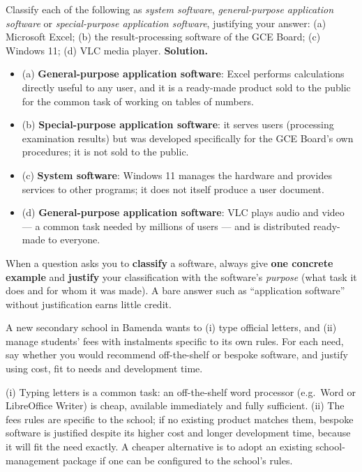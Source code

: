 \documentclass[11pt]{article}
\begin{document}
\begin{exoresolu}
Classify each of the following as \emph{system software}, \emph{general-purpose application software} or \emph{special-purpose application software}, justifying your answer: (a) Microsoft Excel; (b) the result-processing software of the GCE Board; (c) Windows 11; (d) VLC media player.
\tcblower
\textbf{Solution.}
\begin{itemize}
\item (a) \textbf{General-purpose application software}: Excel performs calculations directly useful to any user, and it is a ready-made product sold to the public for the common task of working on tables of numbers.
\item (b) \textbf{Special-purpose application software}: it serves users (processing examination results) but was developed specifically for the GCE Board's own procedures; it is not sold to the public.
\item (c) \textbf{System software}: Windows 11 manages the hardware and provides services to other programs; it does not itself produce a user document.
\item (d) \textbf{General-purpose application software}: VLC plays audio and video --- a common task needed by millions of users --- and is distributed ready-made to everyone.
\end{itemize}
\end{exoresolu}

\begin{attention}
When a question asks you to \textbf{classify} a software, always give \textbf{one concrete example} and \textbf{justify} your classification with the software's \emph{purpose} (what task it does and for whom it was made). A bare answer such as ``application software'' without justification earns little credit.
\end{attention}

\begin{exercice}
A new secondary school in Bamenda wants to (i) type official letters, and (ii) manage students' fees with instalments specific to its own rules. For each need, say whether you would recommend off-the-shelf or bespoke software, and justify using cost, fit to needs and development time.
\end{exercice}

\begin{corrige}[Exercise 1]
(i) Typing letters is a common task: an off-the-shelf word processor (e.g.\ Word or LibreOffice Writer) is cheap, available immediately and fully sufficient. (ii) The fees rules are specific to the school; if no existing product matches them, bespoke software is justified despite its higher cost and longer development time, because it will fit the need exactly. A cheaper alternative is to adopt an existing school-management package if one can be configured to the school's rules.
\end{corrige}
\end{document}
